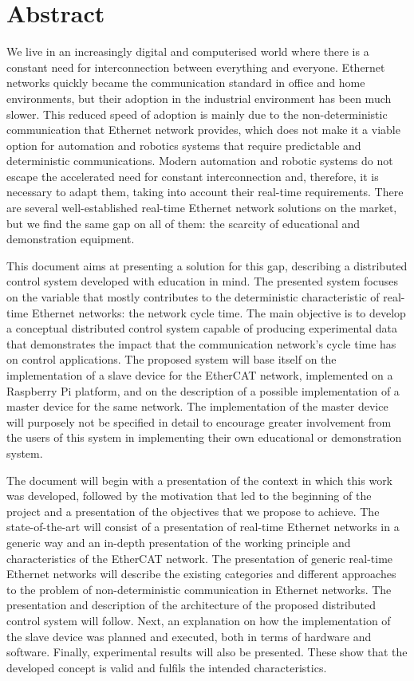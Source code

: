 \chapter*{Abstract}
We live in an increasingly digital and computerised world where there is a constant need for interconnection between everything and everyone.
Ethernet networks quickly became the communication standard in office and home environments, but their adoption in the industrial environment has been much slower.
This reduced speed of adoption is mainly due to the non-deterministic communication that Ethernet network provides, which does not make it a viable option for automation and robotics systems that require predictable and deterministic communications.
Modern automation and robotic systems do not escape the accelerated need for constant interconnection and, therefore, it is necessary to adapt them, taking into account their real-time requirements.
There are several well-established real-time Ethernet network solutions on the market, but we find the same gap on all of them: the scarcity of educational and demonstration equipment.

This document aims at presenting a solution for this gap, describing a distributed control system developed with education in mind.
The presented system focuses on the variable that mostly contributes to the deterministic characteristic of real-time Ethernet networks: the network cycle time.
The main objective is to develop a conceptual distributed control system capable of producing experimental data that demonstrates the impact that the communication network's cycle time has on control applications.
The proposed system will base itself on the implementation of a slave device for the EtherCAT network, implemented on a Raspberry Pi platform, and on the description of a possible implementation of a master device for the same network.
The implementation of the master device will purposely not be specified in detail to encourage greater involvement from the users of this system in implementing their own educational or demonstration system.

The document will begin with a presentation of the context in which this work was developed, followed by the motivation that led to the beginning of the project and a presentation of the objectives that we propose to achieve.
The state-of-the-art will consist of a presentation of real-time Ethernet networks in a generic way and an in-depth presentation of the working principle and characteristics of the EtherCAT network.
The presentation of generic real-time Ethernet networks will describe the existing categories and different approaches to the problem of non-deterministic communication in Ethernet networks.
The presentation and description of the architecture of the proposed distributed control system will follow.
Next, an explanation on how the implementation of the slave device was planned and executed, both in terms of hardware and software.
Finally, experimental results will also be presented.
These show that the developed concept is valid and fulfils the intended characteristics.


